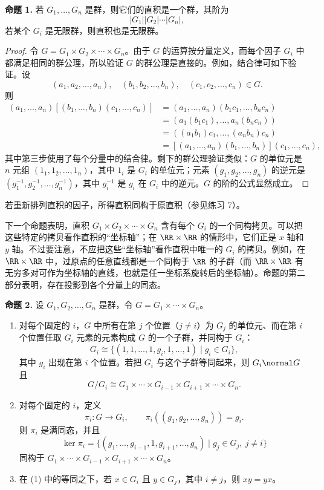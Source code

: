 \medskip
\noindent\textbf{命题 1.} 若 $G_1,\ldots,G_n$ 是群，则它们的直积是一个群，其阶为
\[
  |G_1||G_2|\cdots |G_n|,
\]
若某个 $G_i$ 是无限群，则直积也是无限群。

\begin{proof}
令 $G=G_1\times G_2\times\cdots\times G_n$。由于 $G$ 的运算按分量定义，而每个因子 $G_i$ 中都满足相同的群公理，所以验证 $G$ 的群公理是直接的。例如，结合律可如下验证。设
\[
  (a_1,a_2,\ldots,a_n),\quad (b_1,b_2,\ldots,b_n),\quad (c_1,c_2,\ldots,c_n)\in G.
\]
则
\begin{align*}
(a_1,\ldots,a_n)[(b_1,\ldots,b_n)(c_1,\ldots,c_n)]
&=(a_1,\ldots,a_n)(b_1c_1,\ldots,b_nc_n)\\
&=(a_1(b_1c_1),\ldots,a_n(b_nc_n))\\
&=((a_1b_1)c_1,\ldots,(a_nb_n)c_n)\\
&=[(a_1,\ldots,a_n)(b_1,\ldots,b_n)](c_1,\ldots,c_n),
\end{align*}
其中第三步使用了每个分量中的结合律。剩下的群公理验证类似：$G$ 的单位元是 $n$ 元组 $(1_1,1_2,\ldots,1_n)$，其中 $1_i$ 是 $G_i$ 的单位元；元素 $(g_1,g_2,\ldots,g_n)$ 的逆元是 $(g_1^{-1},g_2^{-1},\ldots,g_n^{-1})$，其中 $g_i^{-1}$ 是 $g_i$ 在 $G_i$ 中的逆元。$G$ 的阶的公式显然成立。
\end{proof}

若重新排列直积的因子，所得直积同构于原直积（参见练习 7）。

下一个命题表明，直积 $G_1\times G_2\times\cdots\times G_n$ 含有每个 $G_i$ 的一个同构拷贝。可以把这些特定的拷贝看作直积的“坐标轴”；在 $\RR\times\RR$ 的情形中，它们正是 $x$ 轴和 $y$ 轴。不过要注意，不应把这些“坐标轴”看作直积中唯一的 $G_i$ 的拷贝。例如，在 $\RR\times\RR$ 中，过原点的任意直线都是一个同构于 $\RR$ 的子群（而 $\RR\times\RR$ 有无穷多对可作为坐标轴的直线，也就是任一坐标系旋转后的坐标轴）。命题的第二部分表明，存在投影到各个分量上的同态。

\medskip
\noindent\textbf{命题 2.} 设 $G_1,G_2,\ldots,G_n$ 是群，令 $G=G_1\times\cdots\times G_n$。
\begin{enumerate}[label=(\arabic*)]
  \item 对每个固定的 $i$，$G$ 中所有在第 $j$ 个位置（$j\neq i$）为 $G_j$ 的单位元、而在第 $i$ 个位置任取 $G_i$ 元素的元素构成 $G$ 的一个子群，并同构于 $G_i$：
  \[
    G_i\cong \{(1,1,\ldots,1,g_i,1,\ldots,1)\mid g_i\in G_i\},
  \]
  其中 $g_i$ 出现在第 $i$ 个位置。若把 $G_i$ 与这个子群等同起来，则 $G_i\normal G$ 且
  \[
    G/G_i\cong G_1\times\cdots\times G_{i-1}\times G_{i+1}\times\cdots\times G_n.
  \]

  \item 对每个固定的 $i$，定义
  \[
    \pi_i:G\to G_i,\qquad \pi_i((g_1,g_2,\ldots,g_n))=g_i.
  \]
  则 $\pi_i$ 是满同态，并且
  \[
    \ker\pi_i=\{(g_1,\ldots,g_{i-1},1,g_{i+1},\ldots,g_n)\mid g_j\in G_j,\ j\neq i\}
  \]
  同构于 $G_1\times\cdots\times G_{i-1}\times G_{i+1}\times\cdots\times G_n$。

  \item 在 (1) 中的等同之下，若 $x\in G_i$ 且 $y\in G_j$，其中 $i\neq j$，则 $xy=yx$。
\end{enumerate}

